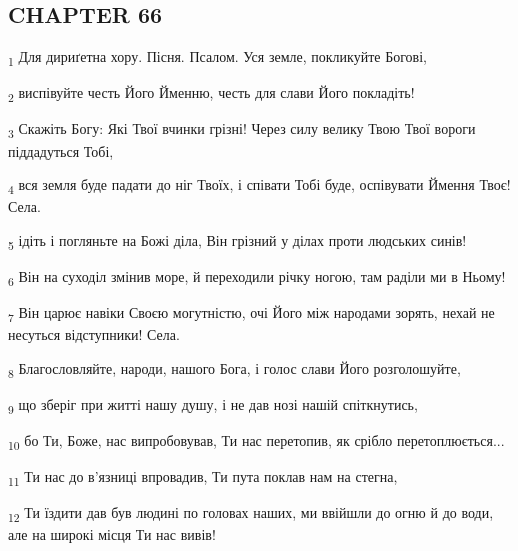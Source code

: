 \subsection{CHAPTER 66}
\begin{tcolorbox}
\textsubscript{1} Для дириґетна хору. Пісня. Псалом. Уся земле, покликуйте Богові,
\end{tcolorbox}
\begin{tcolorbox}
\textsubscript{2} виспівуйте честь Його Йменню, честь для слави Його покладіть!
\end{tcolorbox}
\begin{tcolorbox}
\textsubscript{3} Скажіть Богу: Які Твої вчинки грізні! Через силу велику Твою Твої вороги піддадуться Тобі,
\end{tcolorbox}
\begin{tcolorbox}
\textsubscript{4} вся земля буде падати до ніг Твоїх, і співати Тобі буде, оспівувати Ймення Твоє! Села.
\end{tcolorbox}
\begin{tcolorbox}
\textsubscript{5} ідіть і погляньте на Божі діла, Він грізний у ділах проти людських синів!
\end{tcolorbox}
\begin{tcolorbox}
\textsubscript{6} Він на суходіл змінив море, й переходили річку ногою, там раділи ми в Ньому!
\end{tcolorbox}
\begin{tcolorbox}
\textsubscript{7} Він царює навіки Своєю могутністю, очі Його між народами зорять, нехай не несуться відступники! Села.
\end{tcolorbox}
\begin{tcolorbox}
\textsubscript{8} Благословляйте, народи, нашого Бога, і голос слави Його розголошуйте,
\end{tcolorbox}
\begin{tcolorbox}
\textsubscript{9} що зберіг при житті нашу душу, і не дав нозі нашій спіткнутись,
\end{tcolorbox}
\begin{tcolorbox}
\textsubscript{10} бо Ти, Боже, нас випробовував, Ти нас перетопив, як срібло перетоплюється...
\end{tcolorbox}
\begin{tcolorbox}
\textsubscript{11} Ти нас до в'язниці впровадив, Ти пута поклав нам на стегна,
\end{tcolorbox}
\begin{tcolorbox}
\textsubscript{12} Ти їздити дав був людині по головах наших, ми ввійшли до огню й до води, але на широкі місця Ти нас вивів!
\end{tcolorbox}
